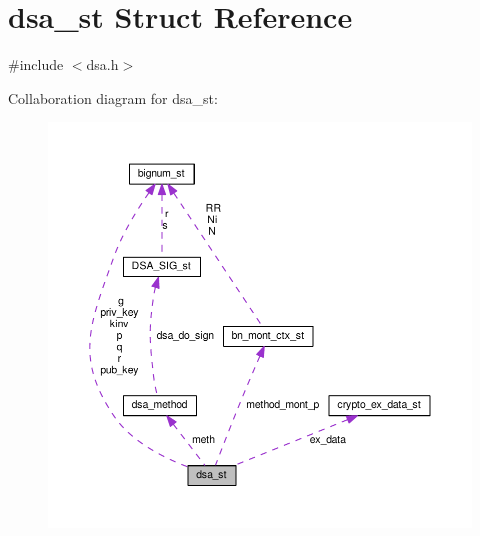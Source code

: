 \hypertarget{structdsa__st}{}\section{dsa\+\_\+st Struct Reference}
\label{structdsa__st}


{\ttfamily \#include $<$dsa.\+h$>$}



Collaboration diagram for dsa\+\_\+st\+:
\nopagebreak
\begin{figure}[H]
\begin{center}
\leavevmode
\includegraphics[width=350pt]{structdsa__st__coll__graph}
\end{center}
\end{figure}

